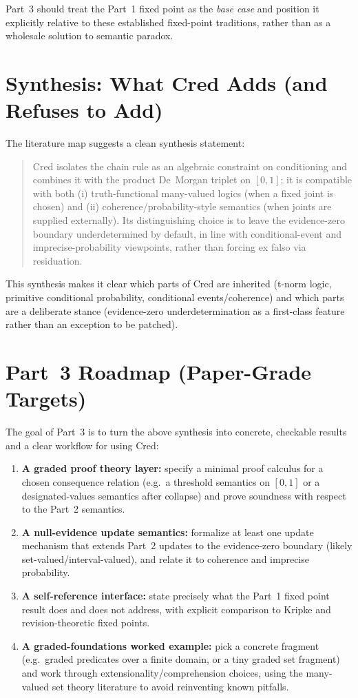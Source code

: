 \documentclass[11pt,a4paper]{article}
\begin{document}
Part~3 should treat the Part~1 fixed point as the \emph{base case} and position
it explicitly relative to these established fixed-point traditions, rather than
as a wholesale solution to semantic paradox.

\section{Synthesis: What Cred Adds (and Refuses to Add)}

The literature map suggests a clean synthesis statement:
\begin{quote}
Cred isolates the chain rule as an algebraic constraint on conditioning and
combines it with the product De~Morgan triplet on $[0,1]$; it is compatible with
both (i) truth-functional many-valued logics (when a fixed joint is chosen) and
(ii) coherence/probability-style semantics (when joints are supplied externally).
Its distinguishing choice is to leave the evidence-zero boundary underdetermined
by default, in line with conditional-event and imprecise-probability viewpoints,
rather than forcing ex falso via residuation.
\end{quote}

This synthesis makes it clear which parts of Cred are inherited (t-norm logic,
primitive conditional probability, conditional events/coherence) and which parts
are a deliberate stance (evidence-zero underdetermination as a first-class
feature rather than an exception to be patched).

\section{Part~3 Roadmap (Paper-Grade Targets)}

The goal of Part~3 is to turn the above synthesis into concrete, checkable
results and a clear workflow for using Cred:
\begin{enumerate}[label=(\arabic*),nosep]
\item \textbf{A graded proof theory layer:} specify a minimal proof calculus
for a chosen consequence relation (e.g.\ a threshold semantics on $[0,1]$ or a
designated-values semantics after collapse) and prove soundness with respect to
the Part~2 semantics.
\item \textbf{A null-evidence update semantics:} formalize at least one update
mechanism that extends Part~2 updates to the evidence-zero boundary (likely
set-valued/interval-valued), and relate it to coherence and imprecise probability.
\item \textbf{A self-reference interface:} state precisely what the Part~1 fixed
point result does and does not address, with explicit comparison to Kripke and
revision-theoretic fixed points.
\item \textbf{A graded-foundations worked example:} pick a concrete fragment
(e.g.\ graded predicates over a finite domain, or a tiny graded set fragment) and
work through extensionality/comprehension choices, using the many-valued set
theory literature to avoid reinventing known pitfalls.
\end{enumerate}
\end{document}
